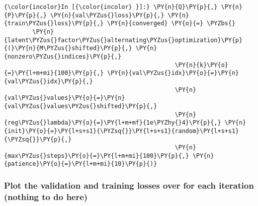     \begin{Verbatim}[commandchars=\\\{\}]
{\color{incolor}In [{\color{incolor} }]:} \PY{n}{Q}\PY{p}{,} \PY{n}{P}\PY{p}{,} \PY{n}{val\PYZus{}loss}\PY{p}{,} \PY{n}{train\PYZus{}loss}\PY{p}{,} \PY{n}{converged} \PY{o}{=} \PYZbs{}
        \PY{n}{latent\PYZus{}factor\PYZus{}alternating\PYZus{}optimization}\PY{p}{(}\PY{n}{M\PYZus{}shifted}\PY{p}{,} \PY{n}{nonzero\PYZus{}indices}\PY{p}{,} 
                                                \PY{n}{k}\PY{o}{=}\PY{l+m+mi}{100}\PY{p}{,} \PY{n}{val\PYZus{}idx}\PY{o}{=}\PY{n}{val\PYZus{}idx}\PY{p}{,}
                                                \PY{n}{val\PYZus{}values}\PY{o}{=}\PY{n}{val\PYZus{}values\PYZus{}shifted}\PY{p}{,} 
                                                \PY{n}{reg\PYZus{}lambda}\PY{o}{=}\PY{l+m+mf}{1e\PYZhy{}4}\PY{p}{,} \PY{n}{init}\PY{o}{=}\PY{l+s+s1}{\PYZsq{}}\PY{l+s+s1}{random}\PY{l+s+s1}{\PYZsq{}}\PY{p}{,}
                                                \PY{n}{max\PYZus{}steps}\PY{o}{=}\PY{l+m+mi}{100}\PY{p}{,} \PY{n}{patience}\PY{o}{=}\PY{l+m+mi}{10}\PY{p}{)}
\end{Verbatim}

    \hypertarget{plot-the-validation-and-training-losses-over-for-each-iteration-nothing-to-do-here}{%
\subsubsection{Plot the validation and training losses over for each
iteration (nothing to do
here)}\label{plot-the-validation-and-training-losses-over-for-each-iteration-nothing-to-do-here}}


